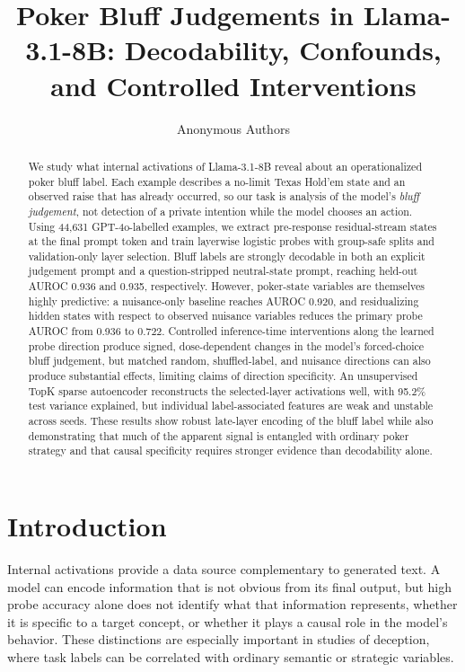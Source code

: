 
\title{Poker Bluff Judgements in Llama-3.1-8B: Decodability, Confounds, and Controlled Interventions}
\author{Anonymous Authors}
\date{}
\maketitle

\begin{abstract}
We study what internal activations of Llama-3.1-8B reveal about an operationalized poker bluff label. Each example describes a no-limit Texas Hold'em state and an observed raise that has already occurred, so our task is analysis of the model's \emph{bluff judgement}, not detection of a private intention while the model chooses an action. Using 44,631 GPT-4o-labelled examples, we extract pre-response residual-stream states at the final prompt token and train layerwise logistic probes with group-safe splits and validation-only layer selection. Bluff labels are strongly decodable in both an explicit judgement prompt and a question-stripped neutral-state prompt, reaching held-out AUROC 0.936 and 0.935, respectively. However, poker-state variables are themselves highly predictive: a nuisance-only baseline reaches AUROC 0.920, and residualizing hidden states with respect to observed nuisance variables reduces the primary probe AUROC from 0.936 to 0.722. Controlled inference-time interventions along the learned probe direction produce signed, dose-dependent changes in the model's forced-choice bluff judgement, but matched random, shuffled-label, and nuisance directions can also produce substantial effects, limiting claims of direction specificity. An unsupervised TopK sparse autoencoder reconstructs the selected-layer activations well, with 95.2\% test variance explained, but individual label-associated features are weak and unstable across seeds. These results show robust late-layer encoding of the bluff label while also demonstrating that much of the apparent signal is entangled with ordinary poker strategy and that causal specificity requires stronger evidence than decodability alone.
\end{abstract}

\section{Introduction}
Internal activations provide a data source complementary to generated text. A model can encode information that is not obvious from its final output, but high probe accuracy alone does not identify what that information represents, whether it is specific to a target concept, or whether it plays a causal role in the model's behavior. These distinctions are especially important in studies of deception, where task labels can be correlated with ordinary semantic or strategic variables.

